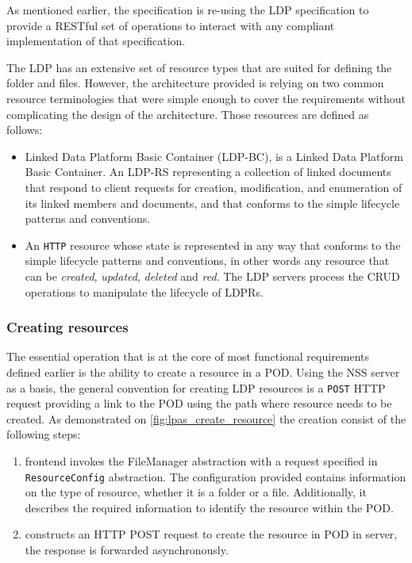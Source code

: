As mentioned earlier, the \solid{} specification is re-using the LDP specification to provide a RESTful set of operations to interact with any compliant implementation of that specification. 

The LDP has an extensive set of resource types that are suited for defining the folder and files. However, the architecture provided is relying on two common resource terminologies that were simple enough to cover the requirements without complicating the design of the architecture. Those resources are defined as follows:

\begin{itemize}
     \item Linked Data Platform Basic Container (LDP-BC), is a Linked Data Platform Basic Container. An LDP-RS representing a collection of linked documents that respond to client requests for creation, modification, and enumeration of its linked members and documents, and that conforms to the simple lifecycle patterns and conventions.
    \item An \texttt{HTTP} resource whose state is represented in any way that conforms to the simple lifecycle patterns and conventions, in other words any resource that can be \textit{created}, \textit{updated}, \textit{deleted} and \textit{red}. The LDP servers process the CRUD operations to manipulate the lifecycle of LDPRs.
\end{itemize}


\subsubsection{Creating resources}

The essential operation that is at the core of most functional requirements defined earlier is the ability to create a resource in a POD. Using the NSS server as a basis, the general convention for creating LDP resources is a \texttt{POST} HTTP request providing a link to the POD using the path where resource needs to be created. As demonstrated on \autoref{fig:lpas_create_resource} the creation consist of the following steps:
\begin{enumerate}
    \item \lpa{} frontend invokes the FileManager abstraction with a request specified in \texttt{ResourceConfig} abstraction. The configuration provided contains information on the type of resource, whether it is a folder or a file. Additionally, it describes the required information to identify the resource within the POD.
    \item \lpas{} constructs an HTTP POST request to create the resource in POD in \solid{} server, the response is forwarded asynchronously.
\end{enumerate}

